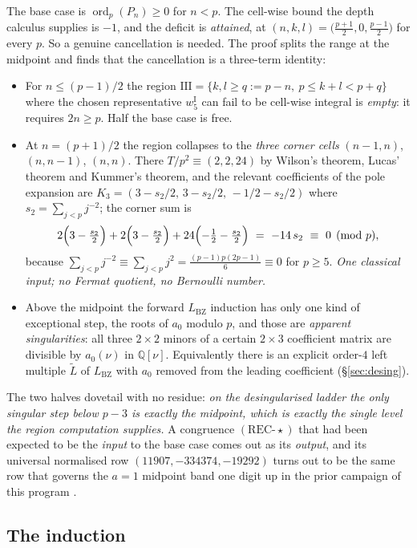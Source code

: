 \documentclass[11pt,reqno]{amsart}
\theoremstyle{plain}
\theoremstyle{definition}
\theoremstyle{remark}
\numberwithin{equation}{section}
\newcommand{\QQ}{\mathbb{Q}}
\newcommand{\ord}{\operatorname{ord}}
\newcommand{\LBZ}{L_{\mathrm{BZ}}}
\begin{document}
The base case is $\ord_p(P_n)\ge0$ for $n<p$. The cell-wise bound the depth calculus supplies
is $-1$, and the deficit is \emph{attained}, at $(n,k,l)=\bigl(\tfrac{p+1}{2},0,\tfrac{p-1}{2}\bigr)$
for every $p$. So a genuine cancellation is needed. The proof splits the range at the midpoint
and finds that the cancellation is a three-term identity:

\begin{itemize}[leftmargin=1.6em]
\item For $n\le(p-1)/2$ the region $\mathrm{III}=\{k,l\ge q:=p-n,\ p\le k+l<p+q\}$ where the
  chosen representative $w_5^{\mathrm I}$ can fail to be cell-wise integral is \emph{empty}: it
  requires $2n\ge p$. Half the base case is free.
\item At $n=(p+1)/2$ the region collapses to the \emph{three corner cells}
  $(n-1,n)$, $(n,n-1)$, $(n,n)$. There $T/p^2\equiv(2,2,24)$ by Wilson's theorem, Lucas'
  theorem and Kummer's theorem, and the relevant coefficients of the pole expansion are
  $K_3=(3-s_2/2,\,3-s_2/2,\,-1/2-s_2/2)$ where $s_2=\sum_{j<p}j^{-2}$; the corner sum is
  \[
  2\Bigl(3-\tfrac{s_2}{2}\Bigr)+2\Bigl(3-\tfrac{s_2}{2}\Bigr)+24\Bigl(-\tfrac12-\tfrac{s_2}{2}\Bigr)
  \ =\ -14\,s_2\ \equiv\ 0\pmod p ,
  \]
  because $\sum_{j<p}j^{-2}\equiv\sum_{j<p}j^{2}=\tfrac{(p-1)p(2p-1)}{6}\equiv0$ for $p\ge5$.
  \emph{One classical input; no Fermat quotient, no Bernoulli number.}
\item Above the midpoint the forward $\LBZ$ induction has only one kind of exceptional step,
  the roots of $a_0$ modulo $p$, and those are \emph{apparent singularities}: all three
  $2\times2$ minors of a certain $2\times3$ coefficient matrix are divisible by $a_0(\nu)$ in
  $\QQ[\nu]$. Equivalently there is an explicit order-$4$ left multiple $\tilde L$ of $\LBZ$
  with $a_0$ removed from the leading coefficient (\S\ref{sec:desing}).
\end{itemize}

The two halves dovetail with no residue: \emph{on the desingularised ladder the only singular
step below $p-3$ is exactly the midpoint, which is exactly the single level the region
computation supplies.} A congruence $(\mathrm{REC}\text{-}\star)$ that had been expected to be
the \emph{input} to the base case comes out as its \emph{output}, and its universal normalised
row $(11907,-334374,-19292)$ turns out to be the same row that governs the $a=1$ midpoint band
one digit up in the prior campaign of this program \cite{ProgA1MID}.

\subsection{The induction}
\end{document}
